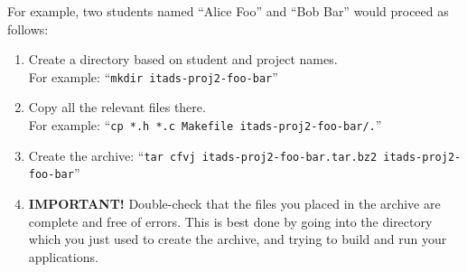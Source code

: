 \documentclass[a4paper,10pt]{article}
\begin{document}
For example, two students named ``Alice Foo'' and ``Bob Bar'' would proceed as follows:
\begin{enumerate}
\item
  Create a directory based on student and project names.\\
  For example: ``\texttt{mkdir itads-proj2-foo-bar}''
\item
  Copy all the relevant files there.\\
  For example: ``\texttt{cp *.h *.c Makefile itads-proj2-foo-bar/.}''
\item
  Create the archive: ``\texttt{tar cfvj itads-proj2-foo-bar.tar.bz2 itads-proj2-foo-bar}''
\item
  \textbf{IMPORTANT!}
  Double-check that the files you placed in the archive are complete and free of errors.
  This is best done by going into the directory which you just used to create the archive, and trying to build and run your applications.
\end{enumerate}



\footnotesize


\end{document}

